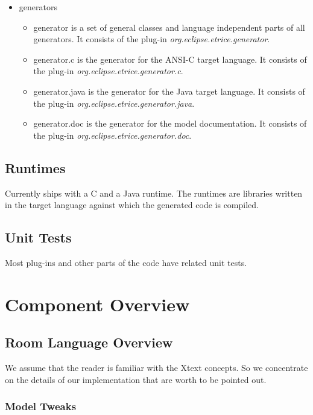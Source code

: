 \begin{itemize}
\item generators
\begin{itemize}
\item generator is a set of general classes and language independent parts of all generators. It consists 
of the plug-in \textit{org.eclipse.etrice.generator}.
\item generator.c is the generator for the ANSI-C target language. It consists of the plug-in 
\textit{org.eclipse.etrice.generator.c}.
\item generator.java is the generator for the Java target language. It consists of the plug-in 
\textit{org.eclipse.etrice.generator.java}.
\item generator.doc is the generator for the model documentation. It consists of the plug-in 
\textit{org.eclipse.etrice.generator.doc}.
\end{itemize}
\end{itemize}

\subsection{Runtimes}

Currently \eTrice{} ships with a C and a Java runtime. The runtimes are libraries written in the target 
language against which the generated code is compiled.

\subsection{Unit Tests}

Most plug-ins and other parts of the code have related unit tests.

\section{Component Overview}

\subsection{Room Language Overview}

We assume that the reader is familiar with the Xtext concepts. So we concentrate on the details of our 
implementation that are worth to be pointed out.

\subsubsection{Model Tweaks}

